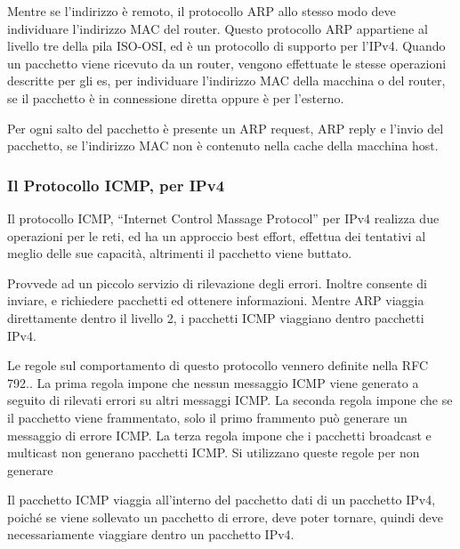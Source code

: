 \documentclass{article}
\numberwithin{equation}{subsection}
\begin{document}
Mentre se l'indirizzo è remoto, il protocollo ARP allo stesso modo deve individuare l'indirizzo MAC del router. Questo protocollo ARP appartiene al livello tre della 
pila ISO-OSI, ed è un protocollo di supporto per l'IPv4. 
Quando un pacchetto viene ricevuto da un router, vengono effettuate le stesse operazioni descritte per gli es, per individuare l'indirizzo MAC della macchina o del 
router, se il pacchetto è in connessione diretta oppure è per l'esterno. 

Per ogni salto del pacchetto è presente un ARP request, ARP reply e l'invio del pacchetto, se l'indirizzo MAC non è contenuto nella cache della macchina host. 

\subsubsection{Il Protocollo ICMP, per IPv4}

Il protocollo ICMP, ``Internet Control Massage Protocol'' per IPv4 realizza due operazioni per le reti, ed ha un approccio best effort, effettua dei tentativi al meglio delle sue capacità, altrimenti 
il pacchetto viene buttato. 

Provvede ad un piccolo servizio di rilevazione degli errori. Inoltre consente di inviare, e richiedere pacchetti ed ottenere informazioni. 
Mentre ARP viaggia direttamente dentro il livello 2, i pacchetti ICMP viaggiano dentro pacchetti IPv4. 

Le regole sul comportamento di questo protocollo vennero definite nella RFC 792.. La prima regola impone che nessun messaggio ICMP viene generato a seguito di 
rilevati errori su altri messaggi ICMP. La seconda regola impone che se il pacchetto viene frammentato, solo il primo frammento può generare un messaggio di errore ICMP. 
La terza regola impone che i pacchetti broadcast e multicast non generano pacchetti ICMP. 
Si utilizzano queste regole per non generare 

Il pacchetto ICMP viaggia all'interno del pacchetto dati di un pacchetto IPv4, poiché se viene sollevato un pacchetto di errore, deve poter tornare, quindi deve 
necessariamente viaggiare dentro un pacchetto IPv4. 
\end{document}
